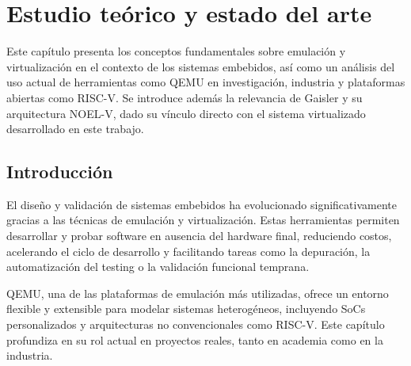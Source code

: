 %
%
%
% 
%
%
%
%
\chapter{Estudio teórico y estado del arte}
\label{cha:estudio-teorico}

Este capítulo presenta los conceptos fundamentales sobre emulación y virtualización en el contexto de los sistemas embebidos, así como un análisis del uso actual de herramientas como QEMU en investigación, industria y plataformas abiertas como RISC-V. Se introduce además la relevancia de Gaisler y su arquitectura NOEL-V, dado su vínculo directo con el sistema virtualizado desarrollado en este trabajo.

\section{Introducción}

El diseño y validación de sistemas embebidos ha evolucionado significativamente gracias a las técnicas de emulación y virtualización. Estas herramientas permiten desarrollar y probar software en ausencia del hardware final, reduciendo costos, acelerando el ciclo de desarrollo y facilitando tareas como la depuración, la automatización del testing o la validación funcional temprana.

QEMU, una de las plataformas de emulación más utilizadas, ofrece un entorno flexible y extensible para modelar sistemas heterogéneos, incluyendo SoCs personalizados y arquitecturas no convencionales como RISC-V. Este capítulo profundiza en su rol actual en proyectos reales, tanto en academia como en la industria.


